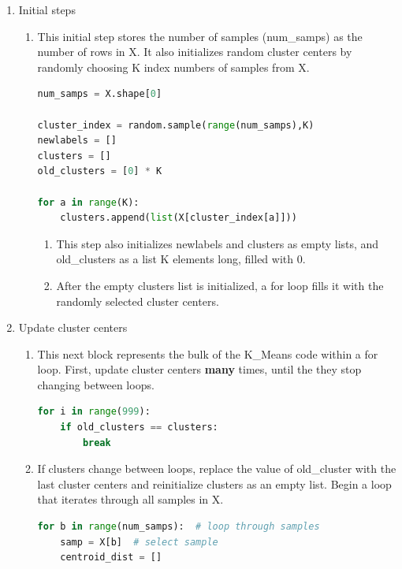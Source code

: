 \documentclass[11pt]{article}
\theoremstyle{definition}
\begin{document}
\begin{enumerate}
    \item Initial steps
        \begin{enumerate}
            \item This initial step stores the number of samples (\textsf{num\_samps}) as the number of rows in \textsf{X}. It also initializes random cluster centers by randomly choosing \textsf{K} index numbers of samples from \textsf{X}.
\begin{lstlisting}[language=python, frame=single]
num_samps = X.shape[0]

cluster_index = random.sample(range(num_samps),K)
newlabels = []
clusters = []
old_clusters = [0] * K

for a in range(K):
    clusters.append(list(X[cluster_index[a]]))
\end{lstlisting}
    \begin{enumerate}
        \item This step also initializes \textsf{newlabels} and \textsf{clusters} as empty lists, and \textsf{old\_clusters} as a list \textsf{K} elements long, filled with 0.
        \item After the empty \textsf{clusters} list is initialized, a for loop fills it with the randomly selected cluster centers.
    \end{enumerate}
    \end{enumerate}
    \item Update cluster centers
    \begin{enumerate}
        \item This next block represents the bulk of the \textsf{K\_Means} code within a for loop. First, update cluster centers \textbf{many} times, until the they stop changing between loops.
\begin{lstlisting}[language=python, frame=single]
for i in range(999): 
    if old_clusters == clusters:
        break
\end{lstlisting}
        \item If clusters change between loops, replace the value of \textsf{old\_cluster} with the last cluster centers and reinitialize \textsf{clusters} as an empty list. Begin a loop that iterates through all samples in \textsf{X}. 
\begin{lstlisting}[language=python, frame=single]
for b in range(num_samps):  # loop through samples
    samp = X[b]  # select sample
    centroid_dist = []
\end{lstlisting}
            \begin{enumerate}

\end{enumerate}
\end{enumerate}
\end{enumerate}
\end{document}
